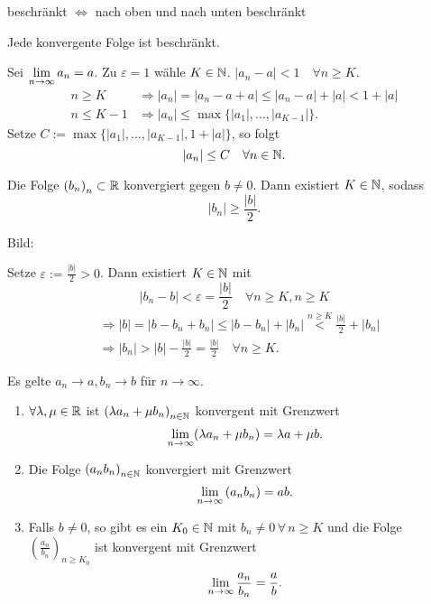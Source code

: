 \documentclass[../ana1.tex]{subfiles}
\begin{document}
\begin{bem}
	beschränkt \(\Leftrightarrow \) nach oben und nach unten beschränkt
\end{bem}
\begin{satz}
	Jede konvergente Folge ist beschränkt.
\end{satz}
\begin{bew}
	Sei \(\lim\limits_{n\rightarrow\infty} a_n = a\). Zu \(\varepsilon = 1\) wähle \(K\in\mathbb{N} \).
	\(|a_n-a|<1 \quad \forall n\geq K\).
	\begin{align*}
		n\geq K &\Rightarrow |a_n| = |a_n -a+a| \leq |a_n -a| + |a| < 1 + |a|\\
		n\leq K-1 &\Rightarrow |a_n| \leq \max \{|a_1|,\ldots,|a_{K-1}|\}.
	\end{align*}
	Setze \(C:= \max \{|a_1|,\ldots,|a_{K-1}|, 1 + |a|\} \), so folgt
	\[|a_n| \leq C \quad\forall n\in\mathbb{N}.\]
\end{bew}
\begin{lem}
	Die Folge \({(b_n)}_n \subset \mathbb{R} \) konvergiert gegen \(b\neq 0\). Dann existiert \(K\in\mathbb{N} \), sodass 
	\[|b_n| \geq \frac{|b|}{2}.\]
\end{lem}
\begin{bew}
	Bild:\\
	\begin{center}
	\end{center}
	Setze \(\varepsilon := \frac{|b|}{2}>0\). Dann existiert \(K\in\mathbb{N} \) mit 
	\[|b_n-b| < \varepsilon = \frac{|b|}{2} \quad\forall n\geq K, n\geq K\]
	\begin{align*}
		&\Rightarrow |b| = |b-b_n + b_n| \leq |b-b_n| + |b_n| \overset{n\geq K}{<} \frac{|b|}{2} + |b_n|\\
		&\Rightarrow |b_n| > |b| - \frac{|b|}{2} = \frac{|b|}{2} \quad \forall n\geq K.
	\end{align*}
\end{bew}
\begin{satz}
	Es gelte \(a_n\rightarrow a, b_n \rightarrow b\) für \(n\rightarrow\infty \).
	\begin{enumerate}
		\item \(\forall \lambda, \mu \in\mathbb{R} \) ist \( {(\lambda a_n + \mu b_n)}_{n\in\mathbb{N}} \) konvergent mit Grenzwert 
		\[\lim\limits_{n\rightarrow\infty} (\lambda a_n + \mu b_n) = \lambda a + \mu b.\]
		\item Die Folge \( {(a_n b_n)}_{n\in\mathbb{N}} \) konvergiert mit Grenzwert 
		\[\lim\limits_{n\rightarrow\infty} {(a_n b_n)} = ab.\]
		\item Falls \(b\neq 0\), so gibt es ein \(K_0 \in\mathbb{N} \) mit \(b_n \neq 0 \, \forall \, n\geq K\) und die Folge \( {\left(\frac{a_n}{b_n}\right)}_{n\geq K_0}\) ist konvergent mit Grenzwert 
		\[\lim\limits_{n\rightarrow\infty} \frac{a_n}{b_n} = \frac{a}{b}.\]
	\end{enumerate}
\end{satz}
\end{document}
